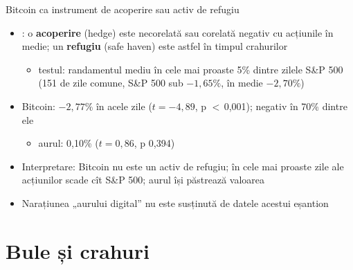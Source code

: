 \begin{frame}{Bitcoin ca instrument de acoperire sau activ de refugiu}
\itemsize{\small}
\begin{itemize}
    \item {}: o \textbf{acoperire} (hedge) este necorelată sau corelată negativ cu acțiunile în medie; un \textbf{refugiu} (safe haven) este astfel în timpul crahurilor
    \begin{itemize}
        \item testul: randamentul mediu în cele mai proaste 5\% dintre zilele S\&P 500 (151 de zile comune, S\&P 500 sub $-1{,}65\%$, în medie $-2{,}70\%$)
    \end{itemize}
    \item Bitcoin: $-2{,}77\%$ în acele zile ($t = -4{,}89$, p $<$\,0{,}001); negativ în 70\% dintre ele
    \begin{itemize}
        \item aurul: 0{,}10\% ($t = 0{,}86$, p 0{,}394)
    \end{itemize}
    \item Interpretare: Bitcoin nu este un activ de refugiu; în cele mai proaste zile ale acțiunilor scade cît S\&P 500; aurul își păstrează valoarea
    \item Narațiunea „aurului digital” nu este susținută de datele acestui eșantion
\end{itemize}
\end{frame}


\section{Bule și crahuri}

